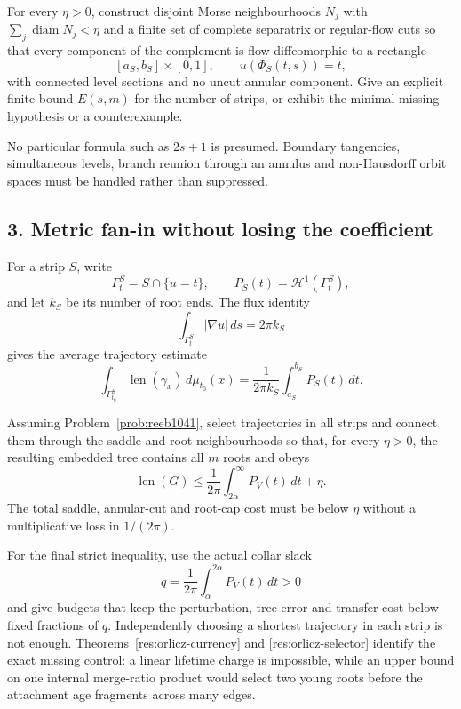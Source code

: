 \documentclass[11pt]{article}
\begin{document}
\begin{problem}\label{prob:reeb1041}
For every $\eta>0$, construct disjoint Morse neighbourhoods $N_j$ with
$\sum_j\operatorname{diam}N_j<\eta$ and a finite set of complete separatrix or
regular-flow cuts so that every component of the complement is flow-diffeomorphic
to a rectangle
\[
 [a_S,b_S]\times[0,1],\qquad u(\Phi_S(t,s))=t,
\]
with connected level sections and no uncut annular component.  Give an explicit
finite bound $E(s,m)$ for the number of strips, or exhibit the minimal missing
hypothesis or a counterexample.
\end{problem}

No particular formula such as $2s+1$ is presumed.  Boundary tangencies,
simultaneous levels, branch reunion through an annulus and non-Hausdorff orbit
spaces must be handled rather than suppressed.

\subsection*{3. Metric fan-in without losing the coefficient}

For a strip $S$, write
\[
 \Gamma_t^S=S\cap\{u=t\},\qquad
 P_S(t)=\mathcal H^1(\Gamma_t^S),
\]
and let $k_S$ be its number of root ends.  The flux identity
\[
 \int_{\Gamma_t^S}|\nabla u|\,ds=2\pi k_S
\]
gives the average trajectory estimate
\[
 \int_{\Gamma_{t_0}^S}\operatorname{len}(\gamma_x)\,d\mu_{t_0}(x)
 =
 \frac1{2\pi k_S}\int_{a_S}^{b_S}P_S(t)\,dt.
\]

\begin{problem}\label{prob:metric1041}
Assuming Problem~\ref{prob:reeb1041}, select trajectories in all strips and
connect them through the saddle and root neighbourhoods so that, for every
$\eta>0$, the resulting embedded tree contains all $m$ roots and obeys
\[
 \operatorname{len}(G)
 \le\frac1{2\pi}\int_{2\alpha}^{\infty}P_V(t)\,dt+\eta.
\tag{6.1}\label{eq:metric-fanin1041}
\]
The total saddle, annular-cut and root-cap cost must be below $\eta$ without a
multiplicative loss in $1/(2\pi)$.
\end{problem}

For the final strict inequality, use the actual collar slack
\[
 q=\frac1{2\pi}\int_{\alpha}^{2\alpha}P_V(t)\,dt>0
\]
and give budgets that keep the perturbation, tree error and transfer cost below
fixed fractions of $q$.  Independently choosing a shortest trajectory in each
strip is not enough.  Theorems~\ref{res:orlicz-currency} and
\ref{res:orlicz-selector} identify the exact missing control: a linear
lifetime charge is impossible, while an upper bound on one internal
merge-ratio product would select two young roots before the attachment age
fragments across many edges.
\end{document}
